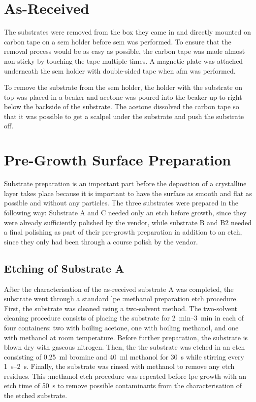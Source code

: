 \section{As-Received}
The substrates were removed from the box they came in and directly mounted on carbon tape on a \ac{sem} holder before \ac{sem} was performed. To ensure that the removal process would be as easy as possible, the carbon tape was made almost non-sticky by touching the tape multiple times. A magnetic plate was attached underneath the \ac{sem} holder with double-sided tape when \ac{afm} was performed. 

To remove the substrate from the \ac{sem} holder, the holder with the substrate on top was placed in a beaker and acetone was poured into the beaker up to right below the backside of the substrate. The acetone dissolved the carbon tape so that it was possible to get a scalpel under the substrate and push the substrate off. %

\section{Pre-Growth Surface Preparation}
Substrate preparation is an important part before the deposition of a crystalline layer takes place because it is important to have the surface as smooth and flat as possible and without any particles. The three substrates were prepared in the following way: Substrate A and C needed only an etch before growth, since they were already sufficiently polished by the vendor, while substrate B and B2 needed a final polishing as part of their pre-growth preparation in addition to an etch, since they only had been through a course polish by the vendor.

\subsection{Etching of Substrate A}\label{sec:subA_etch}

After the characterisation of the as-received substrate A was completed, the substrate went through a standard \ac{lpe} :methanol preparation etch procedure. First, the substrate was cleaned using a two-solvent method. The two-solvent cleaning procedure consists of placing the substrate for \SIrange{2}{3}{\minute} in each of four containers: two with boiling acetone, one with boiling methanol, and one with methanol at room temperature. Before further preparation, the substrate is blown dry with gaseous nitrogen. Then, the the substrate was etched in an etch consisting of \SI{0.25}{\milli\litre} bromine and \SI{40}{\milli\litre} methanol for \SI{30}{\second} while stirring every \SIrange{1}{2}{\second}. Finally, the substrate was rinsed with methanol to remove any etch residues. This :methanol etch procedure was repeated before \ac{lpe} growth with an etch time of \SI{50}{\second} to remove possible contaminants from the characterisation of the etched substrate. %


